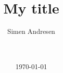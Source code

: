 




\title{My title}
\author{Simen Andresen}
\date{\ \\ \ \\ \today}



\captionsetup{width=0.8\textwidth}

\newcommand{\bs}{\boldsymbol}
\newcommand{\taub}{\bs \tau}
\newcommand{\vdotbb}{\dot{\bs V}_{0b}^B}
\newcommand{\vdotb}[2]{\dot{\bs V}_{#1}^#2}
\newcommand{\vbb}{\bs V_{0b}^B}
\newcommand{\vb}[2]{\ensuremath{\bs V_{#1}^#2}}
\newcommand{\jg}[2]{\ensuremath{\bs J_{#1}^#2}}
\newcommand{\qdot}{\dot{\bs q}}
\newcommand{\xidotb}{\dot{\bs \xi}}
\newcommand{\xib}{\bs \xi}
\newcommand{\zetab}{\bs \zeta}
\newcommand{\zetadotb}{\dot{\bs \zeta}}
\newcommand{\etab}{\ensuremath{\bs \eta}}
\newcommand{\etadotb}{\ensuremath{\dot{\bs \eta}}}
\newcommand{\adg}[1]{\ensuremath{\bs{Ad}_{g_{#1}}}}
\newcommand{\adgb}{\ensuremath{\bs{Ad}_{g_{0b}}}}
\renewcommand{\frame}[1]{\ensuremath{\mathcal{F}_{#1}}}
\newcommand{\Real}[1]{\ensuremath{\mathbb{R}^{#1}}}
\newcommand{\rb}[1]{\ensuremath{\bs R_{#1}}}
\newcommand{\pb}[1]{\ensuremath{\bs p_{#1}}}
\newcommand{\jb}[2]{\ensuremath{\bs J_{#1}^{#2}}}

\pagestyle{empty}
\titleAT

\
\cleardoublepage





\cleardoublepage
\tableofcontents
\cleardoublepage

\pagestyle{fancy}
\chead{}
\setcounter{page}{1}

\lfoot{\thepage}











\newpage

%

